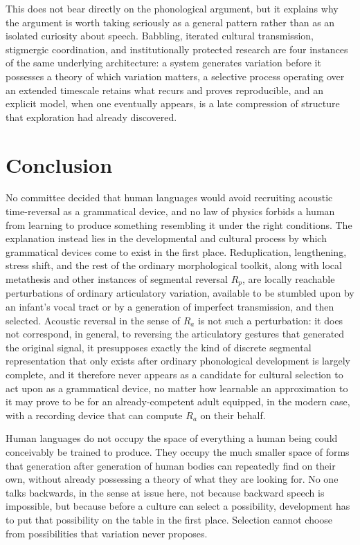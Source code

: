 \documentclass[11pt]{article}
\begin{document}
This does not bear directly on the phonological argument, but it explains why the argument is worth taking seriously as a general pattern rather than as an isolated curiosity about speech. Babbling, iterated cultural transmission, stigmergic coordination, and institutionally protected research are four instances of the same underlying architecture: a system generates variation before it possesses a theory of which variation matters, a selective process operating over an extended timescale retains what recurs and proves reproducible, and an explicit model, when one eventually appears, is a late compression of structure that exploration had already discovered.

\section{Conclusion}

No committee decided that human languages would avoid recruiting acoustic time-reversal as a grammatical device, and no law of physics forbids a human from learning to produce something resembling it under the right conditions. The explanation instead lies in the developmental and cultural process by which grammatical devices come to exist in the first place. Reduplication, lengthening, stress shift, and the rest of the ordinary morphological toolkit, along with local metathesis and other instances of segmental reversal $R_p$, are locally reachable perturbations of ordinary articulatory variation, available to be stumbled upon by an infant's vocal tract or by a generation of imperfect transmission, and then selected. Acoustic reversal in the sense of $R_a$ is not such a perturbation: it does not correspond, in general, to reversing the articulatory gestures that generated the original signal, it presupposes exactly the kind of discrete segmental representation that only exists after ordinary phonological development is largely complete, and it therefore never appears as a candidate for cultural selection to act upon as a grammatical device, no matter how learnable an approximation to it may prove to be for an already-competent adult equipped, in the modern case, with a recording device that can compute $R_a$ on their behalf.

Human languages do not occupy the space of everything a human being could conceivably be trained to produce. They occupy the much smaller space of forms that generation after generation of human bodies can repeatedly find on their own, without already possessing a theory of what they are looking for. No one talks backwards, in the sense at issue here, not because backward speech is impossible, but because before a culture can select a possibility, development has to put that possibility on the table in the first place. Selection cannot choose from possibilities that variation never proposes.
\end{document}
